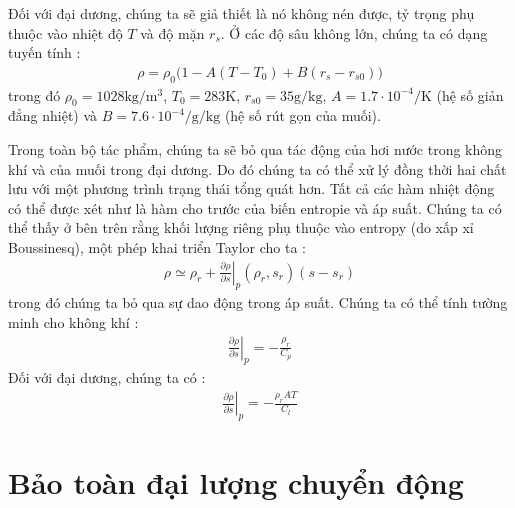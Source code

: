 \documentclass[DONG_HOC_KHI_QUYEN.tex]{subfiles}
\begin{document}
Đối với đại dương, chúng ta sẽ giả thiết là nó không nén được, tỷ trọng phụ thuộc vào nhiệt độ $T$ và độ mặn $r_s$. Ở các độ sâu không lớn, chúng ta có dạng tuyến tính :
\begin{equation}
	\begin{aligned}
		\rho = \rho_0 \Big( 1- A(T-T_0) +B(r_s - r_{s0})\Big)
	\end{aligned}
\end{equation}
trong đó $\rho_0 = 1028 \si{\kilogram\per\cubic\meter}$, $T_0 = 283 \si{\kelvin}$, $r_{s0} = 35 \si{\gram\per\kilogram}$, $A = 1.7 \cdot 10^{-4} \si{\per\kelvin}$ (hệ số giản đẳng nhiệt) và $B = 7.6\cdot 10^{-4} \si{\per\gram\per\kilogram}$ (hệ số rút gọn của muối).

Trong toàn bộ tác phẩm, chúng ta sẽ bỏ qua tác động của hơi nước trong không khí và của muối trong đại dương. Do đó chúng ta có thể xử lý đồng thời hai chất lưu với một phương trình trạng thái tổng quát hơn. Tất cả các hàm nhiệt động có thể được xét như là hàm cho trước của biến entropie và áp suất. Chúng ta có thể thấy ở bên trên rằng khối lượng riêng phụ thuộc vào entropy (do xấp xỉ Boussinesq), một phép khai triển Taylor cho ta :\\
\begin{equation}
	\begin{aligned}
		\rho  \simeq {\rho _r} + {\left. {\frac{{\partial \rho }}{{\partial s}}} \right|_p}\left( {{\rho _r},{s_r}} \right)\left( {s - {s_r}} \right)
	\end{aligned}
\end{equation}
trong đó chúng ta bỏ qua sự dao động trong áp suất. Chúng ta có thể tính tường minh cho không khí :
\begin{equation}
	\begin{aligned}
		{\left. {\frac{{\partial \rho }}{{\partial s}}} \right|_p} =  - \frac{{{\rho _r}}}{{{C_p}}}
	\end{aligned}
\end{equation}
Đối với đại dương, chúng ta có :
\begin{equation}
	\begin{aligned}
		{\left. {\frac{{\partial \rho }}{{\partial s}}} \right|_p} =  - \frac{{{\rho _r}AT}}{{{C_l}}}
	\end{aligned}
\end{equation}

\section{Bảo toàn đại lượng chuyển động}
\end{document}
